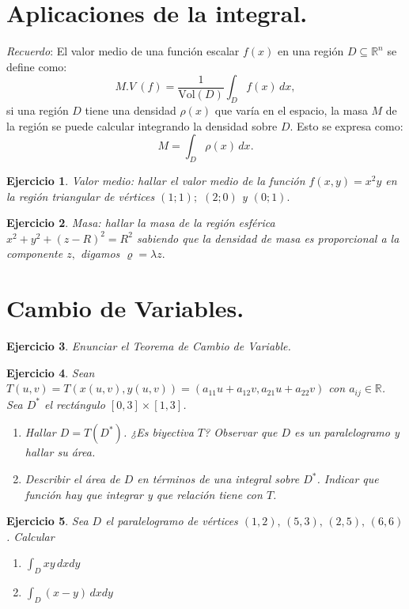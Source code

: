 \documentclass[11pt,a4paper,pdftex]{amsart}
\newtheorem{ej}{Ejercicio}%
\numberwithin{equation}{section}%
\newcommand{\bej}[1]{\begin{ej}\rm{#1}}
\newcommand{\eej}{\end{ej}\vspace{-0.2cm}}
\newcommand{\R}{\mathbb R}
\newcommand{\0}{\mathbb O}
\newcommand{\8}{\infty}
\begin{document}
\section{Aplicaciones de la integral.}
\textit{Recuerdo}: El valor medio de una función escalar $f(x)$ en una región $D \subseteq \mathbb{R}^n$ se define como:
\[
\textit{M.V} \ (f) = \frac{1}{\text{Vol}(D)} \int_D f(x) \, dx,
\]
si una región $D$ tiene una densidad $\rho(x)$ que varía en el espacio, la masa $M$ de la región se puede calcular integrando la densidad sobre $D$. Esto se expresa como:
\[
M = \int_D \rho(x) \, dx.
\]
\bej {\em Valor medio:} hallar el valor medio de la funci\'on $f(x,y)=x^2 y$ en la regi\'on triangular de v\'ertices $(1;1);$ $(2;0)$ y $(0;1).$ \eej

\bej{\label{masa}} {\em Masa:} hallar la masa de la regi\'on esf\'erica $x^2+y^2+(z-R)^2=R^2$ sabiendo que la
densidad de masa es proporcional a la componente $z,$ digamos $\varrho=\lambda z.$ \eej



\section{Cambio de Variables.}

\bej Enunciar el Teorema de Cambio de Variable. 
\eej

\bej {\label{cvl}} Sean $T(u,v)=T(x(u,v),y(u,v))=(a_{11}u+a_{12}v,a_{21}u+a_{22}v)$ con
$a_{ij}\in \R$. Sea $D^*$ el rectángulo $[0,3]\times[1,3]$.
\begin{enumerate}
\item Hallar $D=T(D^*)$. ¿Es  biyectiva $T$?  Observar que $D$ es un paralelogramo y  hallar su área.
\item Describir el área de $D$ en términos de una integral sobre $D^*$. Indicar que función hay que integrar y  que relación tiene con $T$.

\end{enumerate}
\eej

\bej Sea
$D$ el paralelogramo de vértices $(1,2),\,(5,3),\,(2,5),\,(6,6)$.
Calcular
 \begin{enumerate}
  \item $\int_D xy\,dxdy$
   \item $\int_D(x-y)\,dxdy$
 \end{enumerate}

\eej
\end{document}
